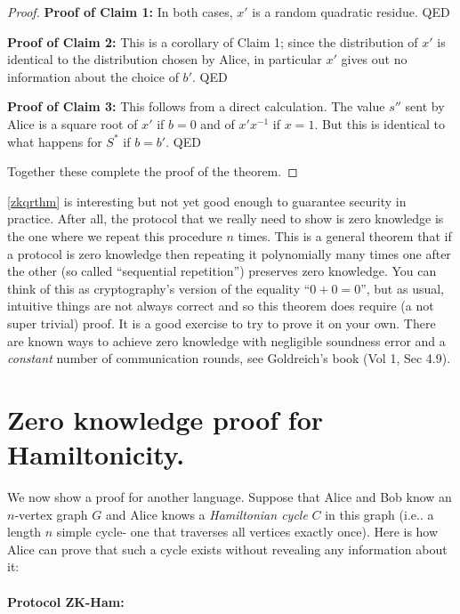 \begin{proof}
\textbf{Proof of Claim 1:} In both cases, \(x'\) is a random quadratic
residue. QED

\textbf{Proof of Claim 2:} This is a corollary of Claim 1; since the
distribution of \(x'\) is identical to the distribution chosen by Alice,
in particular \(x'\) gives out no information about the choice of
\(b'\). QED

\textbf{Proof of Claim 3:} This follows from a direct calculation. The
value \(s''\) sent by Alice is a square root of \(x'\) if \(b=0\) and of
\(x'x^{-1}\) if \(x=1\). But this is identical to what happens for
\(S^*\) if \(b=b'\). QED

Together these complete the proof of the theorem.

\end{proof}

\cref{zkqrthm} is interesting but not yet good enough to guarantee
security in practice. After all, the protocol that we really need to
show is zero knowledge is the one where we repeat this procedure \(n\)
times. This is a general theorem that if a protocol is zero knowledge
then repeating it polynomially many times one after the other (so called
``sequential repetition'') preserves zero knowledge. You can think of
this as cryptography's version of the equality ``\(0+0=0\)'', but as
usual, intuitive things are not always correct and so this theorem does
require (a not super trivial) proof. It is a good exercise to try to
prove it on your own. There are known ways to achieve zero knowledge
with negligible soundness error and a \emph{constant} number of
communication rounds, see Goldreich's book (Vol 1, Sec 4.9).

\section{Zero knowledge proof for
Hamiltonicity.}\label{Zero-knowledge-proof-for-}

We now show a proof for another language. Suppose that Alice and Bob
know an \(n\)-vertex graph \(G\) and Alice knows a \emph{Hamiltonian
cycle} \(C\) in this graph (i.e.. a length \(n\) simple cycle- one that
traverses all vertices exactly once). Here is how Alice can prove that
such a cycle exists without revealing any information about it:

\paragraph{Protocol ZK-Ham:}

